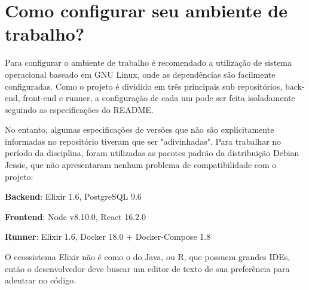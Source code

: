 \section{Como configurar seu ambiente de trabalho?}
\label{cap:como-configurar-seu-ambiente}

 Para configurar o ambiente de trabalho é recomendado a utilização de sistema
 operacional baseado em GNU Linux, onde as dependências são facilmente configuradas.
 Como o projeto é dividido em três principais sub repositórios, back-end, front-end e
 runner, a configuração de cada um pode ser feita isoladamente seguindo as especificações
 do README.

 No entanto, algumas especificações de versões que não são explicitamente
 informadas no repositório tiveram que ser "adivinhadas". Para trabalhar no
 período da disciplina, foram utilizadas as pacotes padrão da distribuição
 Debian Jessie, que não apresentaram nenhum problema de compatibilidade com o projeto:

 \textbf{Backend}: Elixir 1.6, PostgreSQL 9.6

 \textbf{Frontend}: Node v8.10.0, React 16.2.0

 \textbf{Runner}: Elixir 1.6, Docker 18.0 + Docker-Compose 1.8

 O ecossistema Elixir não é como o do Java, ou R, que possuem grandes IDEs, então
 o desenvolvedor deve buscar um editor de texto de sua preferência para adentrar
 no código. 
